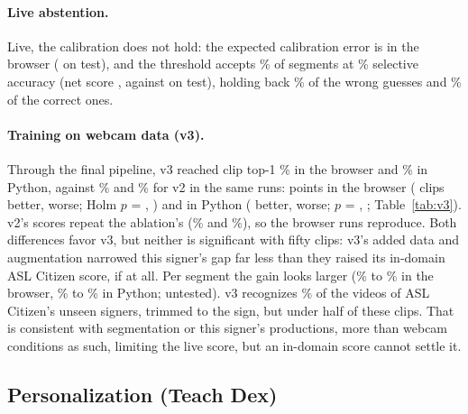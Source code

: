 \paragraph{Live abstention.}
Live, the calibration does not hold: the expected calibration error is  in the
browser ( on test), and the threshold accepts \% of segments at
\% selective accuracy (net score , against  on
test), holding back \% of the wrong guesses and \% of
the correct ones.

\paragraph{Training on webcam data (v3).}
Through the final pipeline, v3 reached clip top-1 \%  in the browser
and \%  in Python, against \% and \% for v2 in
the same runs:  points in the browser ( clips better,
 worse; Holm $p$ = , ) and  in Python
( better,  worse; $p$ = , ;
Table~\ref{tab:v3}). v2's scores repeat the ablation's (\% and
\%), so the browser runs reproduce. Both differences favor v3, but neither
is significant with fifty clips: v3's added data and augmentation narrowed this signer's gap far
less than they raised its in-domain ASL Citizen score, if at all. Per segment the gain looks larger
(\% to \% in the browser, \% to
\% in Python; untested). v3 recognizes \% of the videos of ASL
Citizen's unseen signers, trimmed to the sign, but under half of these clips. That is consistent
with segmentation or this signer's productions, more than webcam conditions as such, limiting the
live score, but an in-domain score cannot settle it.

\subsection{Personalization (Teach Dex)}
\label{sec:teach}

